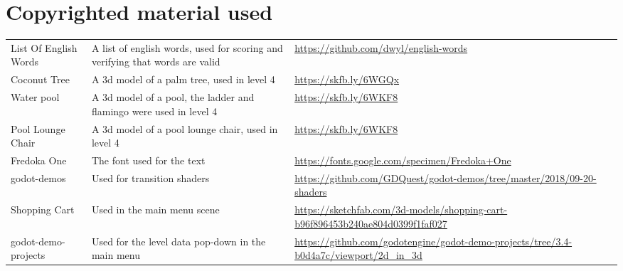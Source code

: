 \documentclass{article}
\begin{document}
	\section{Copyrighted material used}
	\begin{tabular}{p{2cm} p{4cm} p{4cm}}
	List Of English Words & A list of english words, used for scoring and verifying that words are valid & \url{https://github.com/dwyl/english-words}\\
	Coconut Tree & A 3d model of a palm tree, used in level 4 & \url{https://skfb.ly/6WGQx}\\
	Water pool & A 3d model of a pool, the ladder and flamingo were used in level 4 & \url{https://skfb.ly/6WKF8}\\
	Pool Lounge Chair & A 3d model of a pool lounge chair, used in level 4 & \url{https://skfb.ly/6WKF8}\\
	Fredoka One & The font used for the text & \url{https://fonts.google.com/specimen/Fredoka+One}\\
	godot-demos & Used for transition shaders & \url{https://github.com/GDQuest/godot-demos/tree/master/2018/09-20-shaders}\\
	Shopping Cart & Used in the main menu scene & \url{https://sketchfab.com/3d-models/shopping-cart-b96f896453b240ae804d0399f1faf027}\\
	godot-demo-projects & Used for the level data pop-down in the main menu & \url{https://github.com/godotengine/godot-demo-projects/tree/3.4-b0d4a7c/viewport/2d_in_3d}\\
	\end{tabular}
\end{document}
